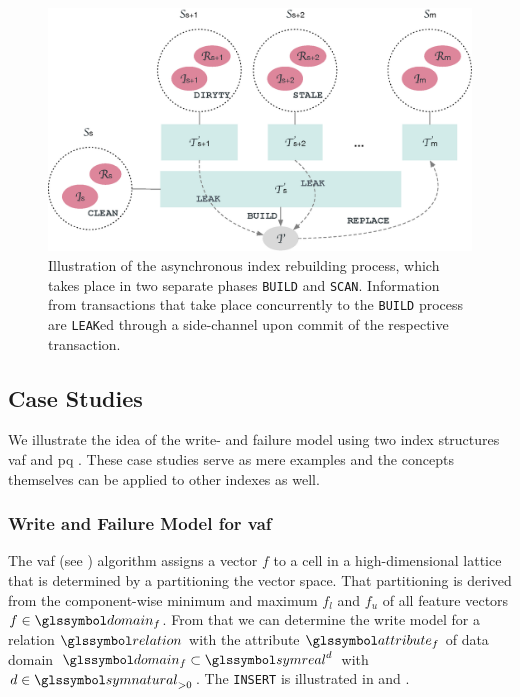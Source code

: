 \begin{figure}
    \centering
    \includegraphics[width=\textwidth]{figures/asynchronous-index-rebuilding}
    \caption{Illustration of the asynchronous index rebuilding process, which takes place in two separate phases \texttt{BUILD} and \texttt{SCAN}. Information from transactions that take place concurrently to the  \texttt{BUILD} process are \texttt{LEAK}ed through a side-channel upon commit of the respective transaction.}
    \label{figure:async_index_rebuild}
\end{figure}

\subsection{Case Studies}

We illustrate the idea of the write- and failure model using two index structures \acrshort{vaf} \cite{Weber:1998Va} and \acrshort{pq} \cite{Jegou:2010Product}. These case studies serve as mere examples and the concepts themselves can be applied to other indexes as well.

\subsubsection{Write and Failure Model for \texorpdfstring{\acrfull{vaf}}{VAF}}

The \acrshort{vaf} (see ) algorithm assigns a vector $f$ to a cell in a high-dimensional lattice that is determined by a partitioning the vector space. That partitioning is derived from the component-wise minimum and maximum $f_{l}$ and $f_{u}$ of all feature vectors $f \in \domain_f$. From that we can determine the write model for a relation $\relation$ with the attribute $\attribute_f$ of data domain $\domain_f \subset \symreal^d$ with $d \in \symnatural_{>0}$. The \texttt{INSERT} is illustrated in  and .

